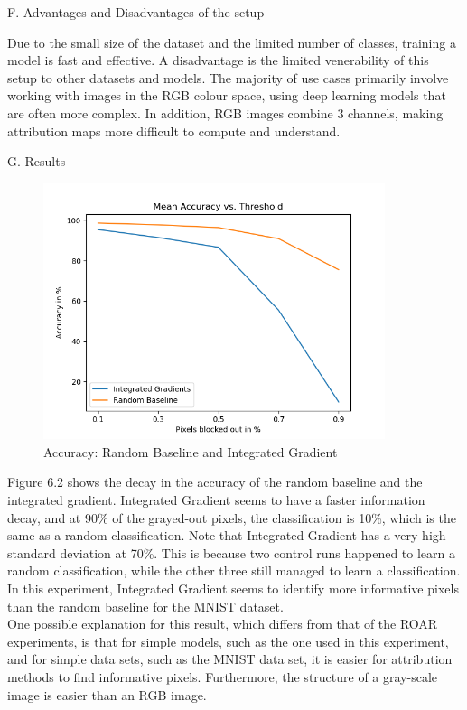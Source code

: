 F. Advantages and Disadvantages of the setup

Due to the small size of the dataset and the limited number of classes, training a model is fast and effective. A disadvantage is the limited venerability of this setup to other datasets and models. The majority of use cases primarily involve working with images in the RGB colour space, using deep learning models that are often more complex. In addition, RGB images combine 3 channels, making attribution maps more difficult to compute and understand.

G. Results

\begin{figure}[H]
	\centering
	\includegraphics[width=100mm]{figs/mean_accuracy_vs_threshold}
	\caption{Accuracy: Random Baseline and Integrated Gradient}
	\label{fig:Accuracy}
	
\end{figure}

Figure 6.2 shows the decay in the accuracy of the random baseline and the integrated gradient. Integrated Gradient seems to have a faster information decay, and at 90\% of the grayed-out pixels, the classification is 10\%, which is the same as a random classification. Note that Integrated Gradient has a very high standard deviation at 70\%. This is because two control runs happened to learn a random classification, while the other three still managed to learn a classification. In this experiment, Integrated Gradient seems to identify more informative pixels than the random baseline for the MNIST dataset. \\
One possible explanation for this result, which differs from that of the ROAR experiments, is that for simple models, such as the one used in this experiment, and for simple data sets, such as the MNIST data set, it is easier for attribution methods to find informative pixels. Furthermore, the structure of a gray-scale image is easier than an RGB image.


